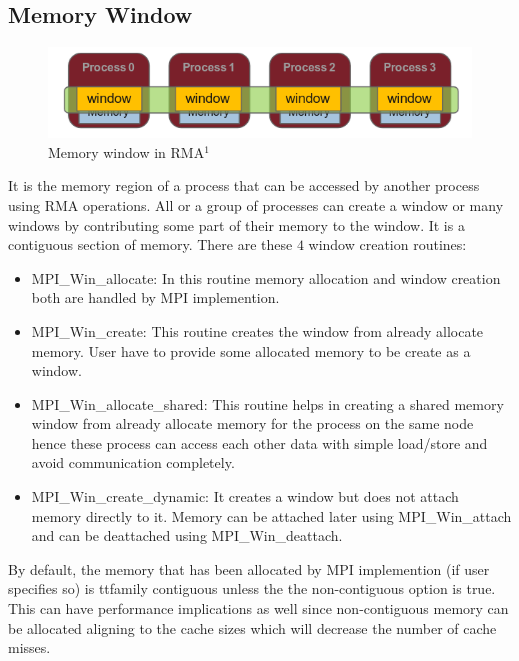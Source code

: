 \subsection{Memory Window}
\begin{figure}[!ht]
    \centering
    \includegraphics[width=0.75\linewidth]{attachments/mem_window.png}
    \caption{Memory window in RMA$^1$}
\end{figure}
It is the memory region of a process that can be accessed by another process using RMA operations. All or a group of processes can 
create a window or many windows by contributing some part of their memory to the window. It is a contiguous section of memory. There
are these $4$ window creation routines:
\begin{itemize}
    \item {\ttfamily MPI\_Win\_allocate:} In this routine memory allocation and window creation both are handled by MPI implemention.
    \item {\ttfamily MPI\_Win\_create:} This routine creates the window from already allocate memory. User have to provide some allocated
    memory to be create as a window.
    \item {\ttfamily MPI\_Win\_allocate\_shared:} This routine helps in creating a shared memory window from already allocate memory for
    the process on the same node hence these process can access each other data with simple load/store and avoid communication completely.
    \item {\ttfamily MPI\_Win\_create\_dynamic:} It creates a window but does not attach memory directly to it. Memory can be attached later
    using {\ttfamily MPI\_Win\_attach} and can be deattached using {\ttfamily MPI\_Win\_deattach}. 
\end{itemize}

By default, the memory that has been allocated by MPI implemention (if user specifies so) is {ttfamily contiguous} unless the
the {\ttfamily non-contiguous} option is {\ttfamily true.} This can have performance implications as well since {\ttfamily non-contiguous}
memory can be allocated aligning to the cache sizes which will decrease the number of cache misses.

